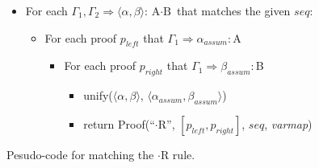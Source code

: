\documentclass[11pt]{article}
\begin{document}
\begin{figure}
\noindent
\begin{boxedminipage}{\textwidth}
\begin{itemize}
  \item For each $\Gamma_1, \Gamma_2 \Rightarrow \langle\alpha, \beta\rangle: \textrm{A$\cdot$B}$ 
  that matches the given $seq$:
  \begin{itemize}
    \item For each proof $p_{left}$ that $\Gamma_1 \Rightarrow \alpha_{assum}:$A
    \begin{itemize}
      \item For each proof $p_{right}$ that $\Gamma_1 \Rightarrow \beta_{assum}:$B
      \begin{itemize}
        \item unify($\langle\alpha, \beta\rangle$, $\langle\alpha_{assum}, \beta_{assum}\rangle$)
        \item return Proof(``$\cdot$R'',
              $\left[p_{left}, p_{right}\right]$, 
              $seq$, \textit{varmap})
      \end{itemize}
    \end{itemize}
  \end{itemize}
\end{itemize}
\vspace{2mm}
\end{boxedminipage}
\caption{Pesudo-code for matching the $\cdot$R rule.}
\label{fig:dot_r}
\end{figure}
\end{document}
